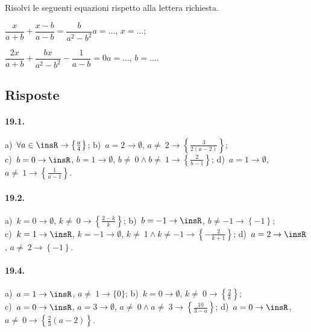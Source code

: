 \begin{esercizio}[\Ast]
\label{ese:19.37}
Risolvi le seguenti equazioni rispetto alla lettera richiesta.
\TabPositions{5cm}
\begin{enumeratea}
 \item $\dfrac{x}{a+b}+\dfrac{x-b}{a-b}=\dfrac{b}{a^{2}-b^{2}}$\tab$a=\ldots$, $x=\ldots$;
 \item $\dfrac{2x}{a+b}+\dfrac{bx}{a^{2}-b^{2}}-\dfrac{1}{a-b}=0$\tab$a=\ldots$, $b=\ldots$.
\end{enumeratea}
\end{esercizio}

\subsection{Risposte}
\paragraph{19.1.}
a)~$\forall a\in \insR \rightarrow \left\{\frac{a}{4}\right\}$;
\quad b)~$a=2 \rightarrow \emptyset$, $a\neq~2 \rightarrow \left\{\frac{3}{2(a-2)}\right\}$;
\quad \protect\\
c)~$b=0 \rightarrow \insR$, $b=1\rightarrow\emptyset$, $b\neq~0\wedge b\neq~1\rightarrow \left\{\frac{2}{b-1}\right\}$;
\quad d)~$a=1\rightarrow \emptyset$, $a\neq~1\rightarrow \left\{\frac{1}{a-1}\right\}$.

\paragraph{19.2.}
a)~$k=0 \rightarrow \emptyset$, $k\neq~0 \rightarrow \left\{\frac{2-k}{k}\right\}$;
\quad b)~$b=-1 \rightarrow \insR$, $b\neq -1 \rightarrow \left\{-1\right\}$;
\quad \protect\\
c)~$k=1 \rightarrow \insR$, $k=-1 \rightarrow \emptyset$, $k\neq~1\wedge k\neq -1 \rightarrow \left\{-{\frac{2}{k+1}}\right\}$;
\quad d)~$a=2 \rightarrow \insR$, $a\neq~2 \rightarrow \left\{-1\right\}$.

\paragraph{19.4.}
a)~$a=1 \rightarrow \insR$, $a\neq~1 \rightarrow \{0\}$;
\quad b)~$k=0 \rightarrow \emptyset$, $k\neq~0 \rightarrow \left\{\frac{2}{k}\right\}$;
\quad \protect\\
c)~$a=0 \rightarrow \insR$, $a=3\rightarrow \emptyset$, $a\neq~0 \wedge a\neq~3 \rightarrow \left\{\frac{10}{3-a}\right\}$;
\quad d)~$a=0 \rightarrow \insR$, $a\neq~0 \rightarrow \left\{\frac{2}{3} (a-2)\right\}$.

